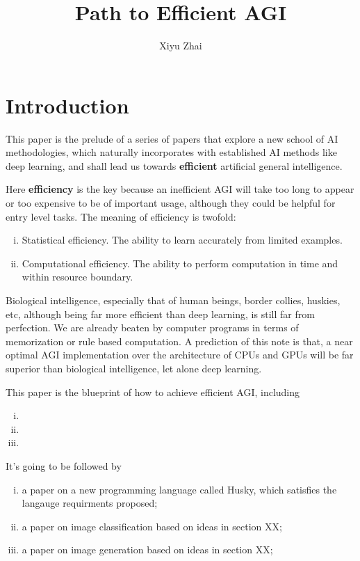 \documentclass[9pt, oneside]{article}   	%
\title{Path to Efficient AGI}
\author{Xiyu Zhai}
\date{}							%
\theoremstyle{definition}
\begin{document}
\maketitle
\tableofcontents

\section{Introduction}

This paper is the prelude of a series of papers that explore a new school of AI methodologies, which naturally incorporates with established AI methods like deep learning, and shall lead us towards \textbf{efficient} artificial general intelligence.

Here \textbf{efficiency} is the key because an inefficient AGI will take too long to appear or too expensive to be of important usage, although they could be helpful for entry level tasks. The meaning of efficiency is twofold:

\begin{enumerate}[(i)]
	\item Statistical efficiency. The ability to learn accurately from limited examples.
	\item Computational efficiency. The ability to perform computation in time and within resource boundary.
\end{enumerate}

Biological intelligence, especially that of human beings, border collies, huskies, etc, although being far more efficient than deep learning, is still far from perfection. We are already beaten by computer programs in terms of memorization or rule based computation. A prediction of this note is that, a near optimal AGI implementation over the architecture of CPUs and GPUs will be far superior than biological intelligence, let alone deep learning.

This paper is the blueprint of how to achieve efficient AGI, including

\begin{enumerate}[(i)]
	\item 
	\item 
	\item 
\end{enumerate}

It's going to be followed by

\begin{enumerate}[(i)]
	\item a paper on a new programming language called Husky, which satisfies the langauge requirments proposed;
	\item a paper on image classification based on ideas in section XX;
	\item a paper on image generation based on ideas in section XX;
\end{enumerate}
\end{document}
